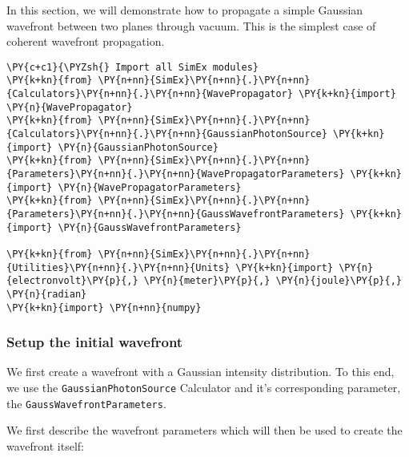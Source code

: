    

In this section, we will demonstrate how to propagate a simple Gaussian
wavefront between two planes through vacuum. This is the simplest case
of coherent wavefront propagation.

    \begin{tcolorbox}[breakable, size=fbox, boxrule=1pt, pad at break*=1mm,colback=cellbackground, colframe=cellborder]
\begin{Verbatim}[commandchars=\\\{\}]
\PY{c+c1}{\PYZsh{} Import all SimEx modules}
\PY{k+kn}{from} \PY{n+nn}{SimEx}\PY{n+nn}{.}\PY{n+nn}{Calculators}\PY{n+nn}{.}\PY{n+nn}{WavePropagator} \PY{k+kn}{import} \PY{n}{WavePropagator}
\PY{k+kn}{from} \PY{n+nn}{SimEx}\PY{n+nn}{.}\PY{n+nn}{Calculators}\PY{n+nn}{.}\PY{n+nn}{GaussianPhotonSource} \PY{k+kn}{import} \PY{n}{GaussianPhotonSource}
\PY{k+kn}{from} \PY{n+nn}{SimEx}\PY{n+nn}{.}\PY{n+nn}{Parameters}\PY{n+nn}{.}\PY{n+nn}{WavePropagatorParameters} \PY{k+kn}{import} \PY{n}{WavePropagatorParameters}
\PY{k+kn}{from} \PY{n+nn}{SimEx}\PY{n+nn}{.}\PY{n+nn}{Parameters}\PY{n+nn}{.}\PY{n+nn}{GaussWavefrontParameters} \PY{k+kn}{import} \PY{n}{GaussWavefrontParameters}

\PY{k+kn}{from} \PY{n+nn}{SimEx}\PY{n+nn}{.}\PY{n+nn}{Utilities}\PY{n+nn}{.}\PY{n+nn}{Units} \PY{k+kn}{import} \PY{n}{electronvolt}\PY{p}{,} \PY{n}{meter}\PY{p}{,} \PY{n}{joule}\PY{p}{,} \PY{n}{radian}
\PY{k+kn}{import} \PY{n+nn}{numpy}
\end{Verbatim}
\end{tcolorbox}

    \hypertarget{setup-the-initial-wavefront}{%
\subsubsection{Setup the initial
wavefront}\label{setup-the-initial-wavefront}}

We first create a wavefront with a Gaussian intensity distribution. To
this end, we use the \texttt{GaussianPhotonSource} Calculator and it's
corresponding parameter, the \texttt{GaussWavefrontParameters}.

    We first describe the wavefront parameters which will then be used to
create the wavefront itself:

